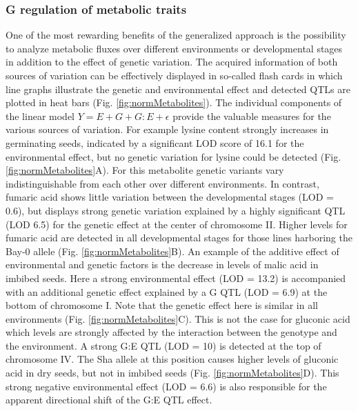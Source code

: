 \subsubsection{G regulation of metabolic traits}
One of the most rewarding benefits of the generalized approach is the possibility to analyze metabolic 
fluxes over different environments or developmental stages in addition to the effect of genetic variation. 
The acquired information of both sources of variation can be effectively displayed in so-called flash cards 
in which line graphs illustrate the genetic and environmental effect and detected QTLs are plotted in heat 
bars (Fig. \ref{fig:normMetabolites}). The individual components of the linear model $Y = E + G + G:E + \epsilon$ 
provide the valuable measures for the various sources of variation. For example lysine content strongly 
increases in germinating seeds, indicated by a significant LOD score of 16.1 for the environmental effect, 
but no genetic variation for lysine could be detected (Fig. \ref{fig:normMetabolites}A). For this metabolite genetic variants vary 
indistinguishable from each other over different environments. In contrast, fumaric acid shows little variation 
between the developmental stages (LOD = 0.6), but displays strong genetic variation explained by a highly 
significant QTL (LOD 6.5) for the genetic effect at the center of chromosome II. Higher levels for fumaric
 acid are detected in all developmental stages for those lines harboring the Bay-0 allele (Fig. \ref{fig:normMetabolites}B). An 
example of the additive effect of environmental and genetic factors is the decrease in levels of malic acid 
in imbibed seeds. Here a strong environmental effect (LOD = 13.2) is accompanied with an additional genetic 
effect explained by a G QTL (LOD = 6.9) at the bottom of chromosome I. Note that the genetic effect here is 
similar in all environments (Fig. \ref{fig:normMetabolites}C). This is not the case for gluconic acid which levels are strongly 
affected by the interaction between the genotype and the environment. A strong G:E QTL (LOD = 10) is detected 
at the top of chromosome IV. The Sha allele at this position causes higher levels of gluconic acid in dry 
seeds, but not in imbibed seeds (Fig. \ref{fig:normMetabolites}D). This strong negative environmental effect (LOD = 6.6) is also 
responsible for the apparent directional shift of the G:E QTL effect.

